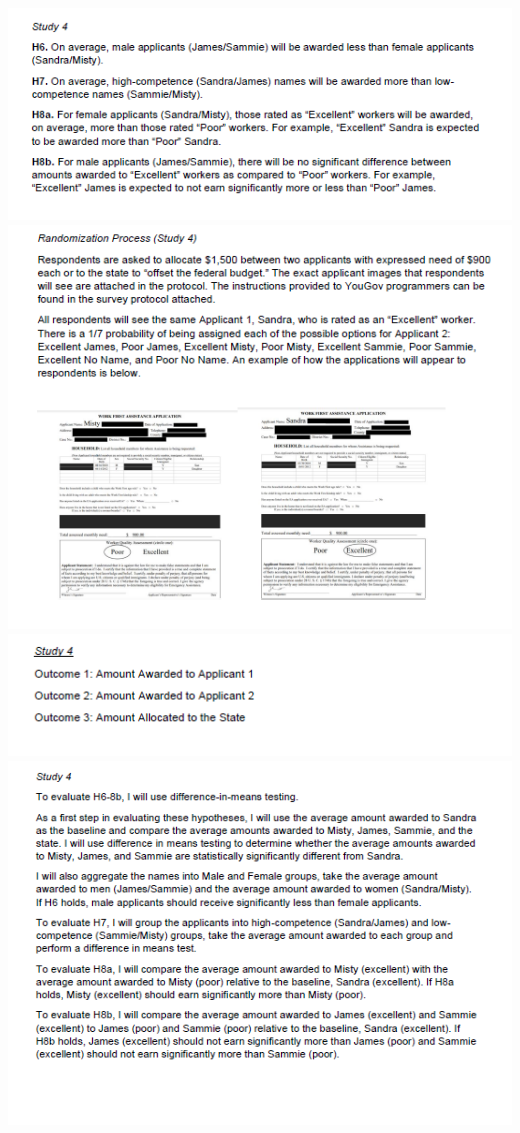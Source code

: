 \documentclass[12pt]{article}%
\begin{document}
\begin{doublespace}
\includegraphics[scale=1.5]{figs/pap3.png} \\
\includegraphics[scale=1.5]{figs/pap4.png} \\
\includegraphics[scale=1.5]{figs/pap5.png} \\
\includegraphics[scale=1.5]{figs/pap6.png}


\end{doublespace}
\end{document}
